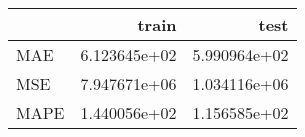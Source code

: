 \begin{tabular}{lrr}
\toprule
{} &         train &          test \\
\midrule
MAE  &  6.123645e+02 &  5.990964e+02 \\
MSE  &  7.947671e+06 &  1.034116e+06 \\
MAPE &  1.440056e+02 &  1.156585e+02 \\
\bottomrule
\end{tabular}

